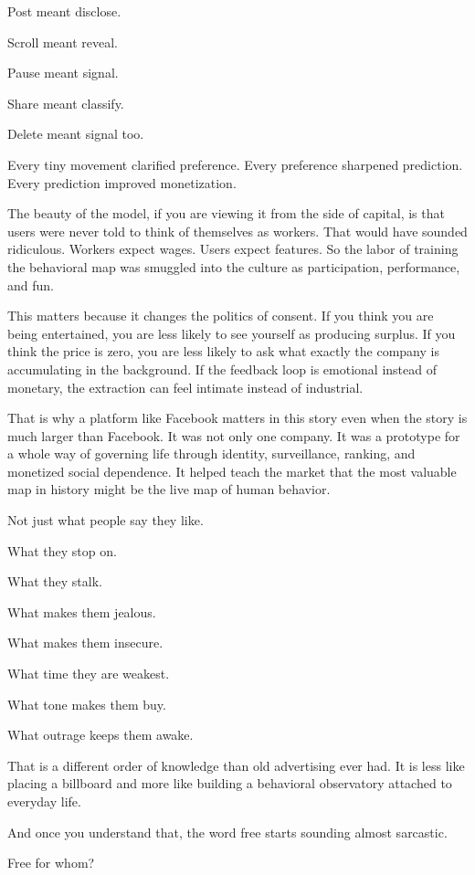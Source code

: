 \documentclass[
  american,
  12pt,
  letterpaper,
]{article}
\begin{document}
Post meant disclose.

Scroll meant reveal.

Pause meant signal.

Share meant classify.

Delete meant signal too.

Every tiny movement clarified preference. Every preference sharpened
prediction. Every prediction improved monetization.

The beauty of the model, if you are viewing it from the side of capital,
is that users were never told to think of themselves as workers. That
would have sounded ridiculous. Workers expect wages. Users expect
features. So the labor of training the behavioral map was smuggled into
the culture as participation, performance, and fun.

This matters because it changes the politics of consent. If you think
you are being entertained, you are less likely to see yourself as
producing surplus. If you think the price is zero, you are less likely
to ask what exactly the company is accumulating in the background. If
the feedback loop is emotional instead of monetary, the extraction can
feel intimate instead of industrial.

That is why a platform like Facebook matters in this story even when the
story is much larger than Facebook. It was not only one company. It was
a prototype for a whole way of governing life through identity,
surveillance, ranking, and monetized social dependence. It helped teach
the market that the most valuable map in history might be the live map
of human behavior.

Not just what people say they like.

What they stop on.

What they stalk.

What makes them jealous.

What makes them insecure.

What time they are weakest.

What tone makes them buy.

What outrage keeps them awake.

That is a different order of knowledge than old advertising ever had. It
is less like placing a billboard and more like building a behavioral
observatory attached to everyday life.

And once you understand that, the word free starts sounding almost
sarcastic.

Free for whom?
\end{document}
